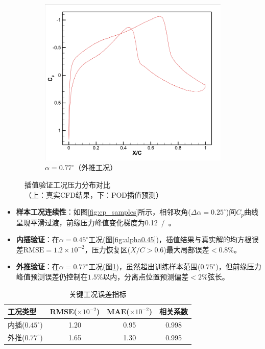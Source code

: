 \begin{figure}[H]
\begin{subfigure}[b]{0.45\textwidth}
\includegraphics[width=0.8\linewidth]{0.77插值.png}
\caption{\songti$\alpha=0.77^\circ$（外推工况）}
\label{fig:alpha0.77}
\end{subfigure}
\caption{\songti 插值验证工况压力分布对比\\
{\songti\footnotesize （上：真实CFD结果，下：POD插值预测）}}
\label{fig:interp_validation}
\end{figure}

\begin{itemize}
\item \textbf{样本工况连续性}：如图\ref{fig:cp_samples}所示，相邻攻角($\Delta\alpha=0.25^\circ$)间$C_p$曲线呈现平滑过渡，前缘压力峰值变化梯度为\SI{0.12}{/\circ}。

\item \textbf{内插验证}：在$\alpha=0.45^\circ$工况(图\ref{fig:alpha0.45})，插值结果与真实解的均方根误差$\text{RMSE}=1.2\times10^{-2}$，压力恢复区($X/C>0.6$)最大局部误差$<0.8\%$。

\item \textbf{外推验证}：在$\alpha=0.77^\circ$工况(图\ref{fig:alpha0.77})，虽然超出训练样本范围($0.75^\circ$)，但前缘压力峰值预测误差仍控制在$1.5\%$以内，分离点位置预测偏差$<2\%$弦长。
\end{itemize}

\begin{table}[H]
\centering
{} %
\caption{关键工况误差指标}
\label{tab:error}
\begin{tabular}{lccc}
\toprule
\rowcolor{gray!20} %
工况类型 & RMSE($\times10^{-2}$) & MAE($\times10^{-2}$) & 相关系数 \\
\midrule
内插($0.45^\circ$) & 1.20 & 0.95 & 0.998 \\
外推($0.77^\circ$) & 1.65 & 1.30 & 0.995 \\
\bottomrule
\end{tabular}
\end{table}

